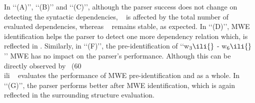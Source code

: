 \documentclass[output=paper]{LSP/langsci}
\begin{document}
\ili{}
\ili{}%
In\ili{} \ili{}`\ili{}`\ili{}(A\ili{})\ili{}'\ili{}'\ili{},\ili{} \ili{}`\ili{}`\ili{}(B\ili{})\ili{}'\ili{}'\ili{} and\ili{} \ili{}`\ili{}`\ili{}(C\ili{})\ili{}'\ili{}'\ili{},\ili{} although\ili{} the\ili{} parser\ili{} success\ili{} does\ili{} not\ili{} change\ili{} on\ili{} detecting\ili{} the\ili{} syntactic\ili{} dependencies\ili{},\ili{} \ili{}\asuo\ili{}~\ili{} is\ili{} affected\ili{} by\ili{} the\ili{} total\ili{} number\ili{} of\ili{} evaluated\ili{} dependencies\ili{},\ili{} whereas\ili{} \ili{}\asus\ili{}~\ili{} remains\ili{} stable\ili{},\ili{} as\ili{} expected\ili{}.\ili{}
In\ili{} \ili{}`\ili{}`\ili{}(D\ili{})\ili{}'\ili{}'\ili{},\ili{} MWE\ili{} identification\ili{} helps\ili{} the\ili{} parser\ili{} to\ili{} detect\ili{} one\ili{} more\ili{} dependency\ili{} relation\ili{} which\ili{},\ili{} is\ili{} reflected\ili{} in\ili{} \ili{}\asus\ili{}{}\ili{}.\ili{}
Similarly\ili{},\ili{} in\ili{} \ili{}`\ili{}`\ili{}(F\ili{})\ili{}'\ili{}'\ili{},\ili{} the\ili{} pre\ili{}-identification\ili{} of\ili{} \ili{} \ili{}`\ili{}`w\ili{}$_3\ili{}$\ili{} \ili{}-\ili{} w\ili{}$_6\ili{}$\ili{}'\ili{}'\ili{} MWE\ili{} has\ili{} no\ili{} impact\ili{} on\ili{} the\ili{} parser\ili{}'s\ili{} performance\ili{}.\ili{}
\ili{}%
Although\ili{} this\ili{} can\ili{} be\ili{} directly\ili{} observed\ili{} by\ili{} \ili{}\asus\ili{}~\ili{}(60\ili{}\\ili{}%
\ili{}%
\ili{}\asuo\ili{}~\ili{} evaluates\ili{} the\ili{} performance\ili{} of\ili{} MWE\ili{} pre\ili{}-identification\ili{} and\ili{} \ili{}\isi{}\ili{} as\ili{} a\ili{} whole\ili{}.\ili{}
\ili{}%
In\ili{} \ili{}`\ili{}`\ili{}(G\ili{})\ili{}'\ili{}'\ili{},\ili{} the\ili{} parser\ili{} performs\ili{} better\ili{} after\ili{} MWE\ili{} identification\ili{},\ili{} which\ili{} is\ili{} again\ili{} reflected\ili{} in\ili{} the\ili{} surrounding\ili{} structure\ili{} evaluation\ili{}.\ili{}
\end{document}
